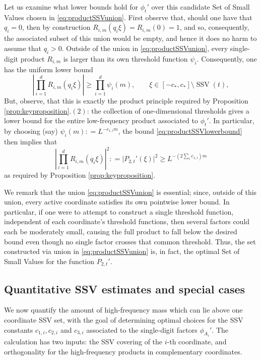 \documentclass[12pt]{amsart}
\numberwithin{equation}{section}
\begin{document}
Let us examine what lower bounds hold for $\phi_t'$ over this candidate Set of Small Values chosen in \eqref{eq:productSSVunion}. First observe that, should one have that $q_i=0$, then by construction $R_{i,m}(q_i\xi)=R_{i,m}(0)=1$, and so, consequently, the associated subset of this union would be empty, and hence it does no harm to assume that $q_i > 0$. Outside of the union in \eqref{eq:productSSVunion}, every single-digit product $R_{i,m}$ is
larger than its own threshold function $\psi_i$.  Consequently, one has the uniform lower bound
\begin{equation}\label{eq:productSSVlowerbound}
 \left|\prod_{i=1}^dR_{i,m}(q_i\xi)\right|
 \geq\prod_{i=1}^d\psi_i(m),
 \qquad \xi\in [-c_*, c_*] \setminus \operatorname{SSV}(t),
\end{equation}
But, observe, that this is exactly the product principle required by Proposition \ref{prop:keyproposition}.$(2)$: the collection of one-dimensional thresholds gives a lower bound for the entire low-frequency product associated to $\phi_t'$. In particular, by choosing (say) $\psi_i (m) : = L^{-c_{1,i} m}$, the bound \eqref{eq:productSSVlowerbound} then implies that
$$
\left|\prod_{i=1}^dR_{i,m}(q_i\xi)\right|^2 : = \big\lvert P_{2,t}' (\xi)\big\rvert^2 \geq L^{-(2 \sum_{i} c_{1,i})m}
$$
as required by Proposition \ref{prop:keyproposition}.

We remark that the union \eqref{eq:productSSVunion} is essential; since, outside of this union, every active coordinate satisfies its own pointwise lower bound. In particular, if one were to attempt to construct a single threshold function, independent of each coordinate's threshold functions, then several factors could each be moderately small, causing the full product to fall below the desired bound even though no single factor crosses that common threshold. Thus, the set constructed via union in \eqref{eq:productSSVunion} is, in fact, the optimal Set of Small Values for the function $P_{2,t}'$.

\subsection{Quantitative SSV estimates and special cases}

We now quantify the amount of high-frequency mass which can lie above one coordinate SSV set, with the goal of determining optimal choices for the SSV constants $c_{1,i}, c_{2,i}$ and $c_{3,i}$ associated to the single-digit factors $\phi_{A_i}'$.  The calculation has two inputs: the SSV covering of the $i$-th coordinate, and orthogonality for the high-frequency products in complementary coordinates.  
\end{document}
